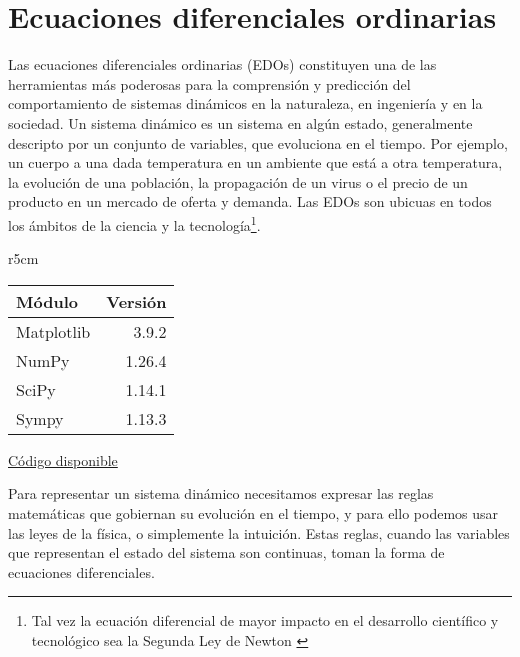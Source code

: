 

\chapter{Ecuaciones diferenciales ordinarias} \label{ch:ordinarias} 

Las ecuaciones diferenciales ordinarias (EDOs) constituyen una de las herramientas más poderosas para la comprensión y predicción del comportamiento de sistemas dinámicos en la naturaleza, en ingeniería y en la sociedad. Un sistema dinámico es un sistema en algún estado, generalmente descripto por un conjunto de variables, que evoluciona en el tiempo. Por ejemplo, un cuerpo a una dada temperatura en un ambiente que está a otra temperatura, la evolución de una población, la propagación de un virus o el precio de un producto en un mercado de oferta y demanda. Las EDOs son ubicuas en todos los ámbitos de la ciencia y la tecnología\footnote{Tal vez la ecuación diferencial de mayor impacto en el desarrollo científico y tecnológico sea la Segunda Ley de Newton \cite{feynman2011}}. 

\begin{wraptable}{r}{5cm}
\begin{modulesinfo}
\begin{center}
{\small
    \begin{tabular}{l r}
        \toprule
        \textbf{Módulo} & \textbf{Versión} \\
        \midrule
        Matplotlib & 3.9.2 \\
        NumPy & 1.26.4 \\
        SciPy & 1.14.1 \\
        Sympy & 1.13.3 \\
        \bottomrule
    \end{tabular}
    \vspace{0.75em}
    
    \href{https://github.com/facundobatista/libro-pyciencia/tree/master/código/ecuaciones_ordinarias/}{Código disponible}
}
\end{center}
\end{modulesinfo}
\end{wraptable}

Para representar un sistema dinámico necesitamos expresar las reglas matemáticas que gobiernan su evolución en el tiempo, y para ello podemos usar las leyes de la física, o simplemente la intuición. Estas reglas, cuando las variables que representan el estado del sistema son continuas, toman la forma de ecuaciones diferenciales.

